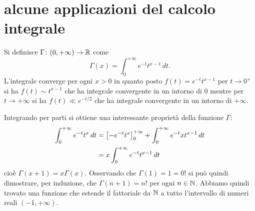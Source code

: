 \section{alcune applicazioni del calcolo integrale}

\begin{example}
Si definisce $\Gamma\colon (0,+\infty) \to \mathbb R$ come
\[
  \Gamma(x) = \int_0^{+\infty} e^{-t} t^{x-1}\, dt.
\]
L'integrale converge per ogni $x>0$ in quanto posto
$f(t) = e^{-t} t^{x-1}$ per $t\to 0^+$ si ha $f(t) \sim t^{x-1}$ che ha
integrale convergente in un intorno di $0$ mentre per $t\to +\infty$ si ha
$f(t) \ll e^{-t/2}$ che ha integrale convergente in un intorno di $+\infty$.

Integrando per parti si ottiene una interessante proprietà della funzione $\Gamma$:
\begin{align*}
\int_0^{+\infty} e^{-t}t^{x}\, dt
&= {\left[ -e^{-t}t^{x} \right]}_0^{+\infty}
+ \int_0^{+\infty} e^{-t}xt^{x-1}\, dt\\
&= x\int_0^{+\infty} e^{-t}t^{x-1}\, dt
\end{align*}
cioè $\Gamma(x+1) = x\Gamma(x)$.
Osservando che $\Gamma(1)=1=0!$ si può quindi dimostrare, per induzione,
che $\Gamma(n+1) = n!$ per ogni $n\in \mathbb N$.
Abbiamo quindi trovato una funzione che estende il fattoriale
da $\mathbb N$ a tutto l'intervallo di numeri reali $(-1,+\infty)$.
\end{example}

